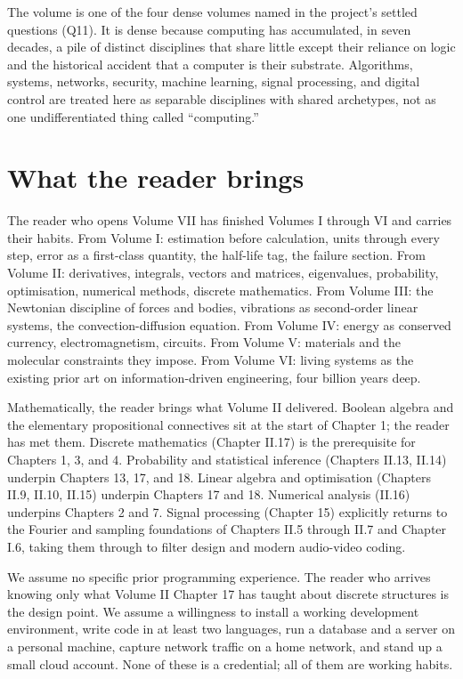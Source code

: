 The volume is one of the four dense volumes named in the project's settled questions (Q11). It is dense because computing has accumulated, in seven decades, a pile of distinct disciplines that share little except their reliance on logic and the historical accident that a computer is their substrate. Algorithms, systems, networks, security, machine learning, signal processing, and digital control are treated here as separable disciplines with shared archetypes, not as one undifferentiated thing called ``computing.''

\section*{What the reader brings}

The reader who opens Volume VII has finished Volumes I through VI and carries their habits. From Volume I: estimation before calculation, units through every step, error as a first-class quantity, the half-life tag, the failure section. From Volume II: derivatives, integrals, vectors and matrices, eigenvalues, probability, optimisation, numerical methods, discrete mathematics. From Volume III: the Newtonian discipline of forces and bodies, vibrations as second-order linear systems, the convection-diffusion equation. From Volume IV: energy as conserved currency, electromagnetism, circuits. From Volume V: materials and the molecular constraints they impose. From Volume VI: living systems as the existing prior art on information-driven engineering, four billion years deep.

Mathematically, the reader brings what Volume II delivered. Boolean algebra and the elementary propositional connectives sit at the start of Chapter 1; the reader has met them. Discrete mathematics (Chapter II.17) is the prerequisite for Chapters 1, 3, and 4. Probability and statistical inference (Chapters II.13, II.14) underpin Chapters 13, 17, and 18. Linear algebra and optimisation (Chapters II.9, II.10, II.15) underpin Chapters 17 and 18. Numerical analysis (II.16) underpins Chapters 2 and 7. Signal processing (Chapter 15) explicitly returns to the Fourier and sampling foundations of Chapters II.5 through II.7 and Chapter I.6, taking them through to filter design and modern audio-video coding.

We assume no specific prior programming experience. The reader who arrives knowing only what Volume II Chapter 17 has taught about discrete structures is the design point. We assume a willingness to install a working development environment, write code in at least two languages, run a database and a server on a personal machine, capture network traffic on a home network, and stand up a small cloud account. None of these is a credential; all of them are working habits.

